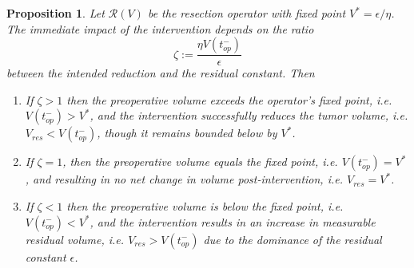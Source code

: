 \documentclass[11pt, reqno]{amsart}
\numberwithin{equation}{section}
\newtheorem{prop}{Proposition}
\theoremstyle{definition}
\begin{document}
\begin{prop}%
\label{prop:critical}
Let $\mathcal{R}(V)$ be the resection operator with fixed point $V^* = \epsilon/\eta$. The immediate impact of the intervention depends on the ratio $$\zeta := \frac{\eta V(t_{op}^-)}{\epsilon}$$ between the intended reduction and the residual constant. Then
\begin{enumerate}
    \item[(i)] %
    If $\zeta > 1$ then the preoperative volume exceeds the operator's fixed point, i.e. $V(t_{op}^-) > V^*$, and the intervention successfully reduces the tumor volume, i.e. $V_{res} < V(t_{op}^-)$, though it remains bounded below by $V^*$.
    \vspace{0.15cm}
    
    \item[(ii)] %
    If $\zeta = 1$, then the preoperative volume equals the fixed point, i.e. $V(t_{op}^-) = V^*$, and resulting in no net change in volume post-intervention, i.e. $V_{res} = V^*$.
    \vspace{0.15cm}
    
    \item[(iii)] %
    If $\zeta < 1$ then the preoperative volume is below the fixed point, i.e. $V(t_{op}^-) < V^*$, and the intervention results in an increase in measurable residual volume, i.e. $V_{res} > V(t_{op}^-)$ due to the dominance of the residual constant $\epsilon$.
\end{enumerate}
\end{prop}
\end{document}

